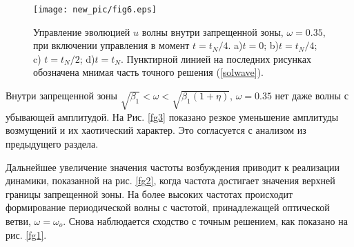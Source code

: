  \begin{figure*}[ht]
\begin{center}
\texttt{[image: new\_pic/fig6.eps]}
\end{center}
\caption{Управление эволюцией $ u $ волны внутри запрещенной зоны, $\omega=0.35$, при включении управления в момент $t=t_N/4$. a)$t=0$; b)$ t=t_N/4$; c) $t=t_N/2$; d)$t=t_N$. Пунктирной линией на последних рисунках обозначена мнимая часть точного решения (\ref{solwave}).}
\label{fg6}
 \end{figure*}
Внутри запрещенной зоны $ \sqrt {\beta_1} <\omega <\sqrt {\beta_1 (1+ \eta)} $, $ \omega = 0.35 $ нет даже волны с убывающей амплитудой. На Рис. \ref{fg3} показано резкое уменьшение амплитуды возмущений и их хаотический характер. Это согласуется с анализом из предыдущего раздела.


Дальнейшее увеличение значения частоты возбуждения приводит к реализации динамики, показанной на рис. \ref {fg2}, когда частота достигает значения верхней границы запрещенной зоны. На более высоких частотах происходит формирование периодической волны с частотой, принадлежащей оптической ветви, $ \omega = \omega_o $. Снова наблюдается сходство с точным решением, как показано на рис. \ref {fg1}.

  
